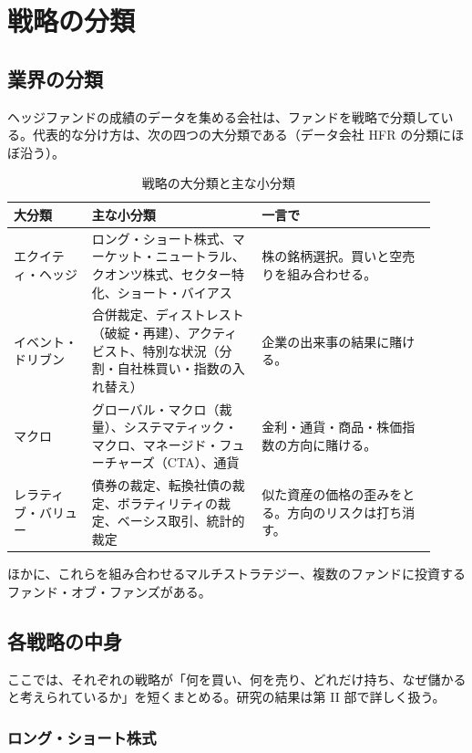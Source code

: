\chapter{戦略の分類}
\label{ch:strategies}

\section{業界の分類}

ヘッジファンドの成績のデータを集める会社は、ファンドを戦略で分類している。代表的な分け方は、次の四つの大分類である（データ会社 HFR の分類にほぼ沿う）。

\begin{table}[H]
\centering\small
\caption{戦略の大分類と主な小分類}
\label{tab:taxonomy}
\begin{tabular}{@{}P{0.17\linewidth}P{0.37\linewidth}P{0.38\linewidth}@{}}
\toprule
大分類 & 主な小分類 & 一言で \\
\midrule
エクイティ・ヘッジ & ロング・ショート株式、マーケット・ニュートラル、クオンツ株式、セクター特化、ショート・バイアス & 株の銘柄選択。買いと空売りを組み合わせる。 \\
イベント・ドリブン & 合併裁定、ディストレスト（破綻・再建）、アクティビスト、特別な状況（分割・自社株買い・指数の入れ替え） & 企業の出来事の結果に賭ける。 \\
マクロ & グローバル・マクロ（裁量）、システマティック・マクロ、マネージド・フューチャーズ（CTA）、通貨 & 金利・通貨・商品・株価指数の方向に賭ける。 \\
レラティブ・バリュー & 債券の裁定、転換社債の裁定、ボラティリティの裁定、ベーシス取引、統計的裁定 & 似た資産の価格の歪みをとる。方向のリスクは打ち消す。 \\
\bottomrule
\end{tabular}
\end{table}

ほかに、これらを組み合わせるマルチストラテジー、複数のファンドに投資するファンド・オブ・ファンズがある。

\section{各戦略の中身}

ここでは、それぞれの戦略が「何を買い、何を売り、どれだけ持ち、なぜ儲かると考えられているか」を短くまとめる。研究の結果は第 II 部で詳しく扱う。

\subsection{ロング・ショート株式}

